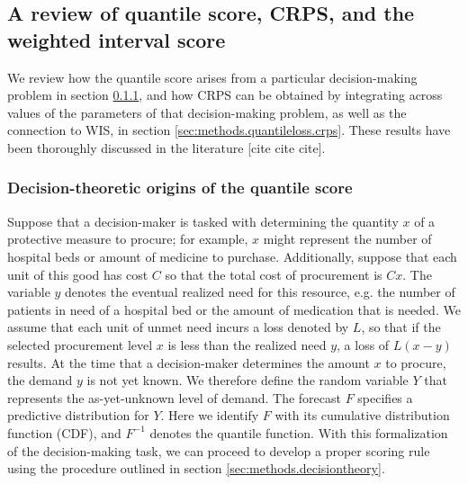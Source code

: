 \documentclass{article}
\begin{document}


\subsection{A review of quantile score, CRPS, and the weighted interval score}
\label{sec:methods.quantileloss}

We review how the quantile score arises from a particular decision-making problem in section \ref{sec:methods.quantileloss.quantile}, and how CRPS can be obtained by integrating across values of the parameters of that decision-making problem, as well as the connection to WIS, in section \ref{sec:methods.quantileloss.crps}. These results have been thoroughly discussed in the literature [cite cite cite].

\subsubsection{Decision-theoretic origins of the quantile score}
\label{sec:methods.quantileloss.quantile}

Suppose that a decision-maker is tasked with determining the quantity $x$ of a protective measure to procure; for example, $x$ might represent the number of hospital beds or amount of medicine to purchase. Additionally, suppose that each unit of this good has cost $C$ so that the total cost of procurement is $Cx$. The variable $y$ denotes the eventual realized need for this resource, e.g. the number of patients in need of a hospital bed or the amount of medication that is needed. We assume that each unit of unmet need incurs a loss denoted by $L$, so that if the selected procurement level $x$ is less than the realized need $y$, a loss of $L(x-y)$ results. At the time that a decision-maker determines the amount $x$ to procure, the demand $y$ is not yet known. We therefore define the random variable $Y$ that represents the as-yet-unknown level of demand. The forecast $F$ specifies a predictive distribution for $Y$. Here we identify $F$ with its cumulative distribution function (CDF), and $F^{-1}$ denotes the quantile function. With this formalization of the decision-making task, we can proceed to develop a proper scoring rule using the procedure outlined in section \ref{sec:methods.decisiontheory}.
\end{document}
